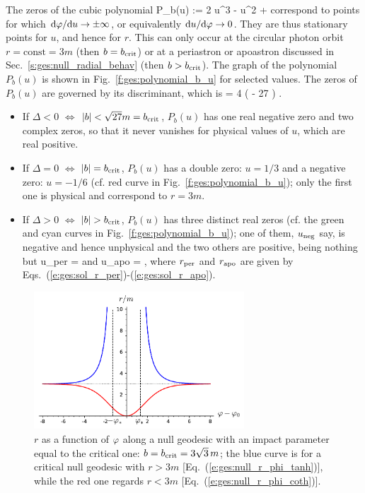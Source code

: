 The zeros of the cubic polynomial
\be \label{e:ges:def_Pb_u}
        P_b(u) := 2 u^3 - u^2 + 
\ee
correspond to points for which $\mathrm{d}\varphi/\mathrm{d} u \to \pm \infty$,
or equivalently $\mathrm{d} u /\mathrm{d}\varphi \to 0$. They are thus stationary points
for $u$, and hence for $r$. This can only occur at the circular photon
orbit $r = \mathrm{const} = 3 m$ (then $b=b_{\rm crit}$)
or at a periastron or apoastron discussed
in Sec.~\ref{s:ges:null_radial_behav} (then $b > b_{\rm crit}$).
The graph of the polynomial $P_b(u)$ is shown in Fig.~\ref{f:ges:polynomial_b_u}
for selected values.
The zeros of $P_b(u)$ are governed by its
discriminant, which is
\be
    \Delta = 4  \left(  - 27 \right) .
\ee
\begin{itemize}
\item If $\Delta<0$ $\iff$ $|b| <\sqrt{27} m = b_{\rm crit}$,
$P_b(u)$ has one real negative zero and two complex zeros, so that it never vanishes
for physical values of $u$, which are real positive.
\item If $\Delta=0$ $\iff$ $|b| = b_{\rm crit}$, $P_b(u)$
has a double zero: $u=1/3$ and a negative zero: $u=-1/6$ (cf. red curve
in Fig.~\ref{f:ges:polynomial_b_u}); only the first
one is physical and correspond to $r=3m$.
\item If $\Delta>0$ $\iff$ $|b| > b_{\rm crit}$, $P_b(u)$ has three distinct
real zeros (cf. the green and cyan curves
in Fig.~\ref{f:ges:polynomial_b_u}); one of them, $u_{\rm neg}$ say, is
negative and hence unphysical and the two others are positive, being nothing but
\be \label{e:ges:def_u_per_apo}
    u_{\rm per} =  \qquad\mbox{and}\qquad
    u_{\rm apo} =  ,
\ee
where $r_{\rm per}$ and $r_{\rm apo}$ are given by
Eqs.~(\ref{e:ges:sol_r_per})-(\ref{e:ges:sol_r_apo}).
\end{itemize}

\begin{figure}
\centerline{\includegraphics[width=0.7\textwidth]{ges_null_r_phi_bcrit.pdf}}
\caption[]{\label{f:ges:null_r_phi_bcrit} \footnotesize
$r$ as a function of $\varphi$ along a null geodesic with an impact parameter
equal to the critical one:
$b = b_{\rm crit} = 3\sqrt{3} \, m$; the blue curve is for a critical
null geodesic with $r>3m$
[Eq.~(\ref{e:ges:null_r_phi_tanh})], while the red one
regards $r<3m$ [Eq.~(\ref{e:ges:null_r_phi_coth})].}
\end{figure}

